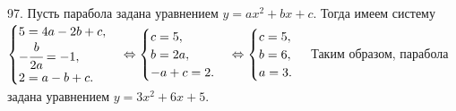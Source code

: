 97. Пусть парабола задана уравнением $y=ax^2+bx+c.$ Тогда имеем систему $\begin{cases} 5=4a-2b+c,\\ -\cfrac{b}{2a}=-1,\\ 2=a-b+c.\end{cases}\Leftrightarrow
\begin{cases} c=5,\\ b=2a,\\ -a+c=2.\end{cases}\Leftrightarrow \begin{cases} c=5,\\ b=6,\\ a=3.\end{cases}$ Таким образом, парабола задана уравнением $y=3x^2+6x+5.$\\
